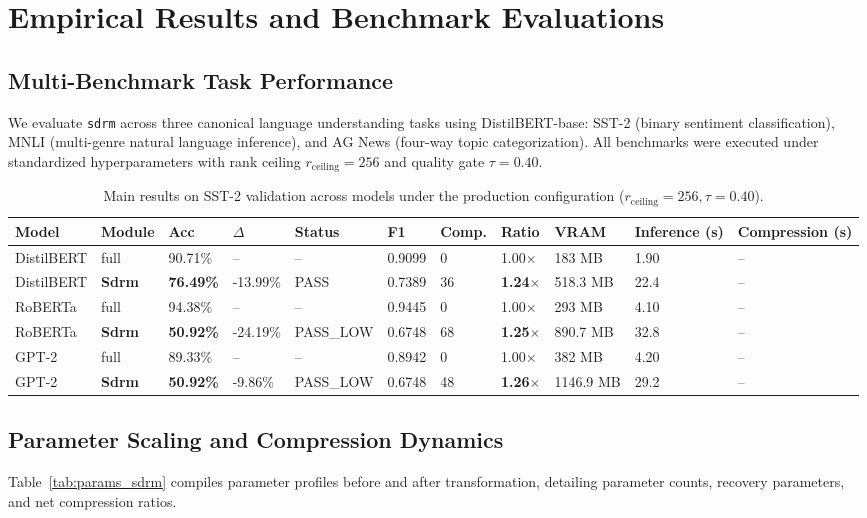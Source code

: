 \section{Empirical Results and Benchmark Evaluations}
\label{sec:results}

\subsection{Multi-Benchmark Task Performance}
We evaluate \texttt{sdrm} across three canonical language understanding tasks using DistilBERT-base: SST-2 (binary sentiment classification), MNLI (multi-genre natural language inference), and AG News (four-way topic categorization). All benchmarks were executed under standardized hyperparameters with rank ceiling $r_{\mathrm{ceiling}} = 256$ and quality gate $\tau = 0.40$.

\begin{table}[t]
\centering
\small
\begin{tabular}{lllllllllll}
\toprule
\textbf{Model} & \textbf{Module} & \textbf{Acc} & \textbf{$\Delta$} & \textbf{Status} & \textbf{F1} & \textbf{Comp.} & \textbf{Ratio} & \textbf{VRAM} & \textbf{Inference (s)} & \textbf{Compression (s)} \\
\midrule
DistilBERT & full & 90.71\% & -- & -- & 0.9099 & 0 & 1.00$\times$ & 183 MB & 1.90 & -- \\
DistilBERT & \textbf{Sdrm} & \textbf{76.49\%} & -13.99\% & PASS & 0.7389 & 36 & \textbf{1.24$\times$} & 518.3 MB & 22.4 & -- \\
RoBERTa & full & 94.38\% & -- & -- & 0.9445 & 0 & 1.00$\times$ & 293 MB & 4.10 & -- \\
RoBERTa & \textbf{Sdrm} & \textbf{50.92\%} & -24.19\% & PASS\_LOW & 0.6748 & 68 & \textbf{1.25$\times$} & 890.7 MB & 32.8 & -- \\
GPT-2 & full & 89.33\% & -- & -- & 0.8942 & 0 & 1.00$\times$ & 382 MB & 4.20 & -- \\
GPT-2 & \textbf{Sdrm} & \textbf{50.92\%} & -9.86\% & PASS\_LOW & 0.6748 & 48 & \textbf{1.26$\times$} & 1146.9 MB & 29.2 & -- \\
\bottomrule
\end{tabular}
\caption{Main results on SST-2 validation across models under the production configuration ($r_{\mathrm{ceiling}}=256, \tau=0.40$).}
\label{tab:main_sst2}
\end{table}

\subsection{Parameter Scaling and Compression Dynamics}
Table~\ref{tab:params_sdrm} compiles parameter profiles before and after transformation, detailing parameter counts, recovery parameters, and net compression ratios.

